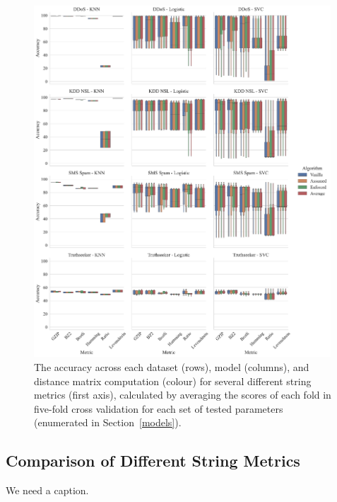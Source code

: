\documentclass[preprint,12pt]{article}
\begin{document}
\begin{figure}[p]
    \centering
    \includegraphics[width=0.99\textwidth]{images/accuracy_vs_algorithm.pdf}
    \caption{The accuracy across each dataset (rows), model (columns), and distance matrix computation (colour) for several different string metrics (first axis), calculated by averaging the scores of each fold in five-fold cross validation for each set of tested parameters (enumerated in Section~\ref{models}).}
    \label{fig:metric_acc}
\end{figure}



\subsection{Comparison of Different String Metrics}

\begin{table}[p]
\begin{center}
\caption{We need a caption.}
\label{table:results}

\end{center}
\end{table}
\end{document}
